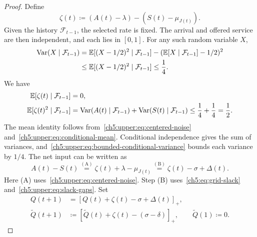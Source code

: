 \begin{proof}
Define
\begin{equation}
 \zeta(t)\coloneqq(A(t)-\lambda)-(S(t)-\mu_{J(t)}).
 \label{ch5:upper:eq:centered-noise}
\end{equation}
Given the history $\mathcal F_{t-1}$, the selected rate is fixed. The
arrival and offered service are then independent, and each lies in $[0,1]$.
For any such random variable $X$,
\begin{equation}
\begin{aligned}
\operatorname{Var}(X\mid\mathcal F_{t-1})
 &=\mathbb{E}[(X-1/2)^2\mid\mathcal F_{t-1}]
-(\mathbb{E}[X\mid\mathcal F_{t-1}]-1/2)^2\\
&\le\mathbb{E}[(X-1/2)^2\mid\mathcal F_{t-1}]
 \le\frac14.
\end{aligned}
\label{ch5:upper:eq:bounded-conditional-variance}
\end{equation}
We have
\begin{equation}
 \begin{aligned}
\mathbb{E}[\zeta(t)\mid\mathcal F_{t-1}]&=0,\\
\mathbb{E}[\zeta(t)^2\mid\mathcal F_{t-1}]
 &=\operatorname{Var}(A(t)\mid\mathcal F_{t-1})
   +\operatorname{Var}(S(t)\mid\mathcal F_{t-1})
\le\frac14+\frac14=\frac12.
\end{aligned}
 \label{ch5:upper:eq:noise-moments}
\end{equation}
The mean identity follows from~\eqref{ch5:upper:eq:centered-noise}
and~\eqref{ch5:upper:eq:conditional-mean}. Conditional independence gives
the sum of variances, and~\eqref{ch5:upper:eq:bounded-conditional-variance}
bounds each variance by $1/4$.
The net input can be written as
\begin{equation}
A(t)-S(t)
 \overset{\mathrm{(A)}}{=}\zeta(t)+\lambda-\mu_{J(t)}
\overset{\mathrm{(B)}}{=}\zeta(t)-\sigma+\Delta(t).
\label{ch5:upper:eq:net-input-decomposition}
\end{equation}
Here (A) uses~\eqref{ch5:upper:eq:centered-noise}. Step (B)
uses~\eqref{ch5:eq:grid-slack} and~\eqref{ch5:upper:eq:slack-gaps}.
Set
\begin{equation}
 \begin{aligned}
 Q(t+1)&=[Q(t)+\zeta(t)-\sigma+\Delta(t)]_+,\\
 \widetilde Q(t+1)
 &\coloneqq[\widetilde Q(t)+\zeta(t)-(\sigma-\delta)]_+,
 \qquad \widetilde Q(1)\coloneqq0.
 \end{aligned}
 \label{ch5:upper:eq:coupled-queues}
\end{equation}


\end{proof}

